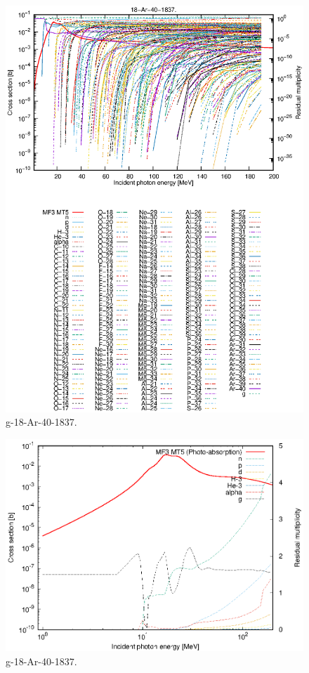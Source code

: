 \begin{figure}
 \includegraphics[width=\linewidth]{eps/g_18-Ar-40_1837.eps}
  \caption{g-18-Ar-40-1837.}
\end{figure}
\newpage \clearpage

\begin{figure}
 \includegraphics[width=\linewidth]{eps-log/g_18-Ar-40_1837.eps}
 \caption{g-18-Ar-40-1837.}
\end{figure}
\newpage \clearpage

